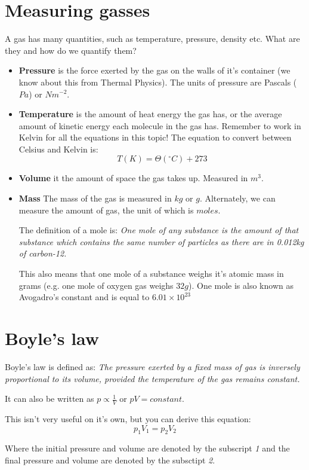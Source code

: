 \documentclass{article}
\begin{document}
\section*{Measuring gasses}
A gas has many quantities, such as temperature, pressure, density etc. What are
they and how do we quantify them?

\begin{itemize}
	\item \textbf{Pressure} is the force exerted by the gas on the walls of it's
	container (we know about this from Thermal Physics). The units of pressure
	are Pascals ($Pa$) or $Nm^{-2}$.
	\item \textbf{Temperature} is the amount of heat energy the gas has, or the
	average amount of kinetic energy each molecule in the gas has. Remember to
	work in Kelvin for all the equations in this topic! The equation to convert
	between Celsius and Kelvin is: 
	\[
		T(K) = \Theta(^\circ C) + 273
	\]
	\item \textbf{Volume} it the amount of space the gas takes up. Measured in
	$m^3$.
	\item \textbf{Mass} The mass of the gas is measured in $kg$ or $g$.
	Alternately, we can measure the amount of gas, the unit of which is $moles$.
	
	The definition of a mole is: \textit{One mole of any substance is the amount
	of that substance which contains the same number of particles as there are
	in 0.012kg of carbon-12.}
	
	This also means that one mole of a substance weighs it's atomic mass in
	grams (e.g. one mole of oxygen gas weighs $32g$). One mole is also known as
	Avogadro's constant and is equal to $6.01 \times 10^{23}$
\end{itemize}

\section*{Boyle's law}
Boyle's law is defined as: \textit{The pressure exerted by a fixed mass of gas
is inversely proportional to its volume, provided the temperature of the gas
remains constant.}

It can also be written as $p \propto \frac{1}{V}$ or $pV = constant$.

This isn't very useful on it's own, but you can derive this equation:
\[
	p_1V_1 = p_2V_2
\]

Where the initial pressure and volume are denoted by the subscript \textit{1}
and the final pressure and volume are denoted by the subsctipt \textit{2}.
\end{document}
